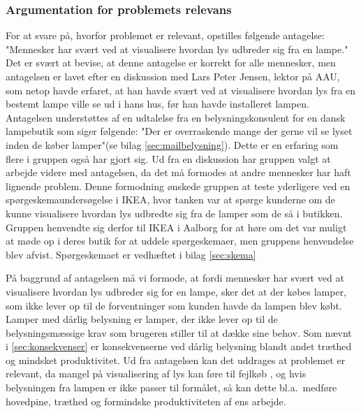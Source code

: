 \subsubsection{Argumentation for problemets relevans}
\label{sec:hvorfor_relavant}
For at svare på, hvorfor problemet er relevant, opstilles følgende antagelse: "Mennesker har svært ved at visualisere hvordan lys udbreder sig fra en lampe." Det er svært at bevise, at denne antagelse er korrekt for alle mennesker, men antagelsen er lavet efter en diskussion med Lars Peter Jensen, lektor på AAU, som netop havde erfaret, at han havde svært ved at visualisere hvordan lys fra en bestemt lampe ville se ud i hans hus, før han havde installeret lampen. Antagelsen understøttes af en udtalelse fra en belysningskonsulent for en dansk lampebutik som siger følgende: "Der er overraskende mange der gerne vil se lyset inden de køber lamper"(se bilag \ref{sec:mailbelysning}). Dette er en erfaring som flere i gruppen også har gjort sig. Ud fra en diskussion har gruppen valgt at arbejde videre med antagelsen, da det må formodes at andre mennesker har haft lignende problem. Denne formodning ønskede gruppen at teste yderligere ved en spørgeskemaundersøgelse i IKEA, hvor tanken var at spørge kunderne om de kunne visualisere hvordan lys udbredte sig fra de lamper som de så i butikken. Gruppen henvendte sig derfor til IKEA i Aalborg for at høre om det var muligt at møde op i deres butik for at uddele spørgeskemaer, men gruppens henvendelse blev afvist. Spørgeskemaet er vedhæftet i bilag \ref{sec:skema}

På baggrund af antagelsen må vi formode, at fordi mennesker har svært ved at visualisere hvordan lys udbreder sig for en lampe, sker det at der købes lamper, som ikke lever op til de forventninger som kunden havde da lampen blev købt. Lamper med dårlig belysning er lamper, der ikke lever op til de belysningsmæssige krav som brugeren stiller til at dække sine behov. Som nævnt i \ref{sec:konsekvenser} er konsekvenserne ved dårlig belysning blandt andet træthed og mindsket produktivitet.
Ud fra antagelsen kan det uddrages at problemet er relevant, da mangel på visualisering af lys kan føre til fejlkøb , og hvis belysningen fra lampen er ikke passer til formålet, så kan dette bl.a.\ medføre hovedpine, træthed og formindske produktiviteten af ens arbejde.
